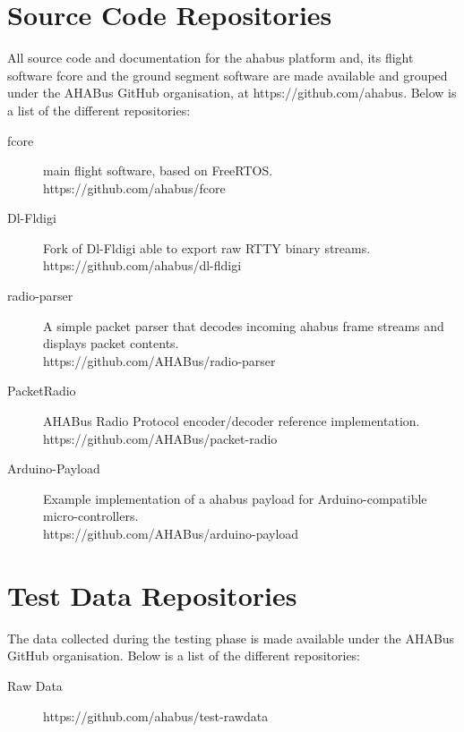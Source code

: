 \begin{appendices}

\chapter{Source Code Repositories}
\label{apx:source-repos}

All source code and documentation for the \acrfull{ahabus} platform and, its flight software \acrfull{fcore} and the ground segment software are made available and grouped under the AHABus GitHub organisation, at https://github.com/ahabus. Below is a list of the different repositories:

\begin{description}
\item[\acrshort{fcore}] main flight software, based on FreeRTOS.\\https://github.com/ahabus/fcore

\item[Dl-Fldigi] Fork of Dl-Fldigi able to export raw RTTY binary streams.\\https://github.com/ahabus/dl-fldigi

\item[radio-parser] A simple packet parser that decodes incoming \acrshort{ahabus} frame streams and displays packet contents.\\https://github.com/AHABus/radio-parser

\item[PacketRadio] AHABus Radio Protocol encoder/decoder reference implementation.\\https://github.com/AHABus/packet-radio

\item[Arduino-Payload] Example implementation of a \acrshort{ahabus} payload for Arduino-compatible micro-controllers.\\https://github.com/AHABus/arduino-payload
\end{description}

\chapter{Test Data Repositories}
\label{apx:test-data-repos}

The data collected during the testing phase is made available under the AHABus GitHub organisation. Below is a list of the different repositories:

\begin{description}
\item[Raw Data] https://github.com/ahabus/test-rawdata


\end{description}
\end{appendices}
